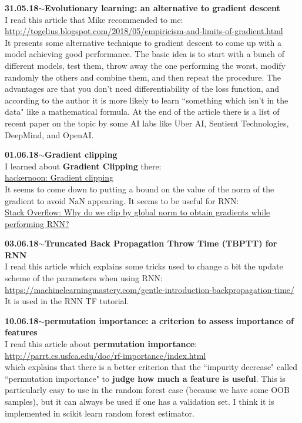 \documentclass[11pt,a4paper]{article}
\newenvironment{loggentry}[2]%
{\noindent\textbf{#1}\hspace{1cm}$\mathbf{\sim}$\text{ }\textbf{#2}\\}{\vspace{0.5cm}}
\begin{document}
\begin{loggentry}{31.05.18}{Evolutionary learning: an alternative to gradient descent}
I read this article that Mike recommended to me:\\
\url{http://togelius.blogspot.com/2018/05/empiricism-and-limits-of-gradient.html}\\
It presents some alternative technique to gradient descent to come up with a model achieving good performance. The basic idea is to start with a bunch of different models, test them, throw away the one performing the worst, modify randomly the others and combine them, and then repeat the procedure. The advantages are that you don't need differentiability of the loss function, and according to the author it is more likely to learn ``something which isn't in the data" like a mathematical formula. At the end of the article there is a list of recent paper on the topic by some AI labs like Uber AI, Sentient Technologies, DeepMind, and OpenAI.\\
\end{loggentry}

\begin{loggentry}{01.06.18}{Gradient clipping}
I learned about \textbf{Gradient Clipping} there:\\
\href{https://hackernoon.com/gradient-clipping-57f04f0adae}{hackernoon: Gradient clipping}\\
It seems to come down to putting a bound on the value of the norm of the gradient to avoid NaN appearing. It seems to be useful for RNN:\\
\href{https://stackoverflow.com/questions/43561853/why-do-we-clip-by-global-norm-to-obtain-gradients-while-performing-rnn#43561977}{Stack Overflow: Why do we clip by global norm to obtain gradients while performing RNN?}
\end{loggentry}

\begin{loggentry}{03.06.18}{Truncated Back Propagation Throw Time (TBPTT) for RNN}
I read this article which explains some tricks used to change a bit the update scheme of the parameters when using RNN:\\
\url{https://machinelearningmastery.com/gentle-introduction-backpropagation-time/}\\
It is used in the RNN TF tutorial.
\end{loggentry}

\begin{loggentry}{10.06.18}{permutation importance: a criterion to assess importance of features}
I read this article about \textbf{permutation importance}:\\
\url{http://parrt.cs.usfca.edu/doc/rf-importance/index.html}\\
which explains that there is a better criterion that the ``impurity decrease" called ``permutation importance" to \textbf{judge how much a feature is useful}. This is particularly easy to use in the random forest case (because we have some OOB samples), but it can always be used if one has a validation set. I think it is implemented in scikit learn random forest estimator.
\end{loggentry}
\end{document}
